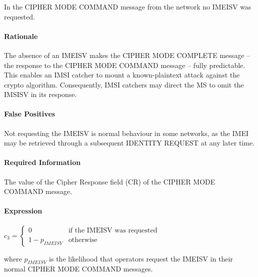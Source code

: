 \documentclass[a4paper,11pt,notitlepage,bigheadings,oneside]{scrartcl}
\begin{document}
\subsubsection{}

In the CIPHER MODE COMMAND message from the network no IMEISV was requested.

\paragraph{Rationale}

The absence of an IMEISV makes the CIPHER MODE COMPLETE message -- the response
to the CIPHER MODE COMMAND message -- fully predictable. This enables an IMSI
catcher to mount a known-plaintext attack against the crypto algorithm.
Consequently, IMSI catchers may direct the MS to omit the IMSISV in its
response.

\paragraph{False Positives}

Not requesting the IMEISV is normal behaviour in some networks, as the IMEI may
be retrieved through a subsequent IDENTITY REQUEST at any later time.

\paragraph{Required Information}

The value of the Cipher Response field (CR) of the CIPHER MODE COMMAND message.

\paragraph{Expression}

$c_3 =
\begin{cases}
	0 		& \text{if the IMEISV was requested} \\
	1 - p_{IMEISV}	& \text{otherwise}
\end{cases}$

where $p_{IMEISV}$ is the likelihood that operators request the IMEISV in their
normal CIPHER MODE COMMAND messages.


\subsubsection{}
\end{document}
